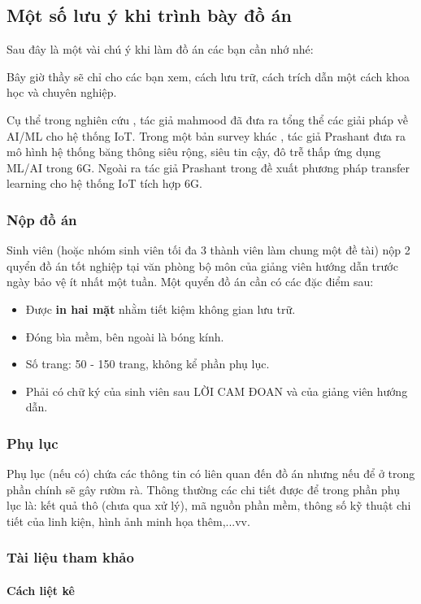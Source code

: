 \documentclass{article} %
\begin{document}
\subsection{Một số lưu ý khi trình bày đồ án}
Sau đây là một vài chú ý khi làm đồ án các bạn cần nhớ nhé:

Bây giờ thầy sẽ chỉ cho các bạn xem, cách lưu trữ, cách trích dẫn một cách khoa học và chuyên nghiệp. 

Cụ thể trong nghiên cứu \cite{Mahmood2022}, tác giả mahmood đã đưa ra tổng thể các giải pháp về AI/ML cho hệ thống IoT. Trong một bản survey khác \cite{Prashant2021}, tác giả Prashant đưa ra mô hình hệ thống băng thông siêu rộng, siêu tin cậy, đô trễ thấp ứng dụng ML/AI trong 6G. Ngoài ra tác giả Prashant trong \cite{Prashant2022} đề xuất phương pháp transfer learning cho hệ thống IoT tích hợp 6G. 

\subsubsection{Nộp đồ án}
Sinh viên (hoặc nhóm sinh viên tối đa 3 thành viên làm chung một đề tài) nộp 2 quyển đồ án tốt nghiệp tại văn phòng bộ môn của giảng viên hướng dẫn trước ngày bảo vệ ít nhất một tuần. Một quyển đồ án cần có các đặc điểm sau:
\begin{itemize}
    \item Được \textbf{in hai mặt} nhằm tiết kiệm không gian lưu trữ.
    \item Đóng bìa mềm, bên ngoài là bóng kính.
    \item Số trang: 50 - 150 trang, không kể phần phụ lục.
    \item Phải có chữ ký của sinh viên sau LỜI CAM ĐOAN và của giảng viên hướng dẫn.
\end{itemize}
\subsubsection{Phụ lục}
Phụ lục (nếu có) chứa các thông tin có liên quan đến đồ án nhưng nếu để ở trong phần chính sẽ gây rườm rà. Thông thường các chi tiết được để trong phần phụ lục là: kết quả thô (chưa qua xử lý), mã nguồn phần mềm, thông số kỹ thuật chi tiết của linh kiện, hình ảnh minh họa thêm,...vv.

\subsubsection{Tài liệu tham khảo}
\paragraph{Cách liệt kê}\mbox{}
\end{document}
